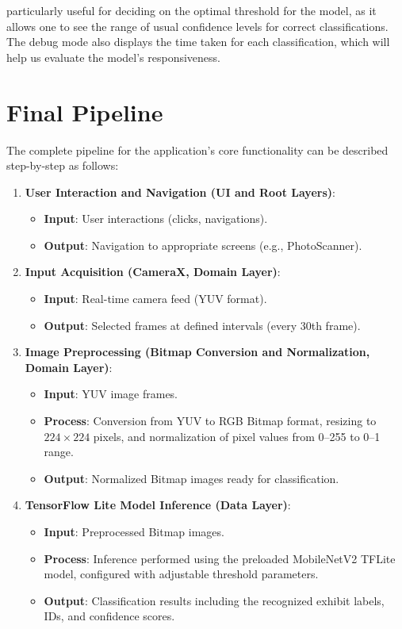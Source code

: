 particularly useful for deciding on the optimal threshold for the model, as it allows one to see the range of usual confidence levels for correct classifications. The debug mode also displays the time taken for each classification, which will help us evaluate the model's responsiveness.

\section{Final Pipeline}

The complete pipeline for the application's core functionality can be described step-by-step as follows:

\begin{enumerate}
\item \textbf{User Interaction and Navigation (UI and Root Layers)}:
\begin{itemize}
\item \textbf{Input}: User interactions (clicks, navigations).
\item \textbf{Output}: Navigation to appropriate screens (e.g., PhotoScanner).
\end{itemize}

\item \textbf{Input Acquisition (CameraX, Domain Layer)}:
\begin{itemize}
    \item \textbf{Input}: Real-time camera feed (YUV format).
    \item \textbf{Output}: Selected frames at defined intervals (every 30th frame).
\end{itemize}

\item \textbf{Image Preprocessing (Bitmap Conversion and Normalization, Domain Layer)}:
\begin{itemize}
    \item \textbf{Input}: YUV image frames.
    \item \textbf{Process}: Conversion from YUV to RGB Bitmap format, resizing to $224 \times 224$ pixels, and normalization of pixel values from 0--255 to 0--1 range.
    \item \textbf{Output}: Normalized Bitmap images ready for classification.
\end{itemize}

\item \textbf{TensorFlow Lite Model Inference (Data Layer)}:
\begin{itemize}
    \item \textbf{Input}: Preprocessed Bitmap images.
    \item \textbf{Process}: Inference performed using the preloaded MobileNetV2 TFLite model, configured with adjustable threshold parameters.
    \item \textbf{Output}: Classification results including the recognized exhibit labels, IDs, and confidence scores.
\end{itemize}


\end{enumerate}
